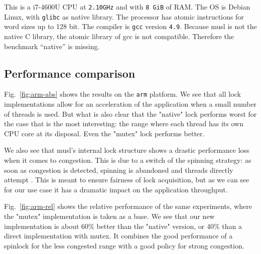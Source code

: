 This is a i7-4600U CPU at \texttt{2.10GHz} and with \texttt{8 GiB} of RAM. The
OS is Debian Linux, with \texttt{glibc} as native library.  The processor
has atomic instructions for word sizes up to 128 bit. The compiler
is \texttt{gcc} version \texttt{4.9}.
%
Because musl is not the native C library, the atomic library of gcc is not
compatible. Therefore the benchmark ``native'' is missing.

\subsection{Performance comparison}
\label{sec-4-4}

Fig.~\ref{fig:arm-abs} shows the results on the \texttt{arm}
platform.
%
We see that all lock implementations allow for an acceleration of
the application when a small number of threads is used. But what is
also clear that the "native" lock performs worst for the case that
is the most interesting: the range where each thread has
its own CPU core at its disposal. Even the "mutex" lock performs better.

We also see that musl's internal lock structure shows a drastic
performance loss when it comes to congestion. This is due to a
switch of the spinning strategy: as soon as congestion is detected,
spinning is abandoned and threads directly attempt
. This is meant to ensure fairness of lock acquisition,
but as we can see for our use case it has a dramatic impact on the
application throughput.

Fig.~\ref{fig:arm-rel} shows the relative performance of the same
experiments, where the "mutex" implementation is taken as a base.
%
We see that our new implementation is about 60\% better than
the "native" version, or 40\% than a direct implementation with
mutex. It combines the good performance of a spinlock for the less
congested range with a good policy for strong congestion.

